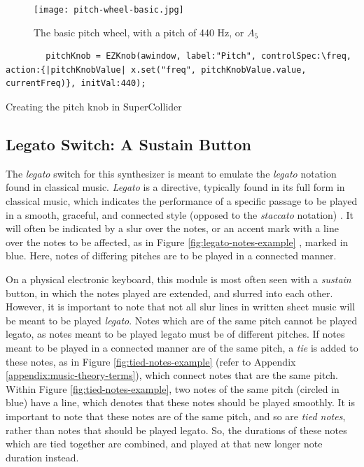 \begin{figure}
  \centering
  \texttt{[image: pitch-wheel-basic.jpg]}
  \caption{The basic pitch wheel, with a pitch of 440 Hz, or $A_5$}
  \label{fig:pitch-wheel-basic}
\end{figure}

\begin{listing}
	\begin{lstlisting}
		pitchKnob = EZKnob(awindow, label:"Pitch", controlSpec:\freq, action:{|pitchKnobValue| x.set("freq", pitchKnobValue.value, currentFreq)}, initVal:440);
	\end{lstlisting}
	\caption{Creating the pitch knob in SuperCollider}
	\label{lst:pitch-knob-waveform}
\end{listing}



\subsection{Legato Switch: A Sustain Button}

The \textit{legato} switch for this synthesizer is meant to emulate the \textit{legato} notation found in classical music. \textit{Legato} is a directive, typically found in its full form in classical music, which indicates the performance of a specific passage to be played in a smooth, graceful, and connected style (opposed to the \textit{staccato} notation) \cite{Winer_2018}. It will often be indicated by a slur over the notes, or an accent mark with a line over the notes to be affected, as in Figure \ref{fig:legato-notes-example} \cite{Henle_2009}, marked in blue. Here, notes of differing pitches are to be played in a connected manner. 

On a physical electronic keyboard, this module is most often seen with a \textit{sustain} button, in which the notes played are extended, and slurred into each other. However, it is important to note that not all slur lines in written sheet music will be meant to be played \textit{legato}. Notes which are of the same pitch cannot be played legato, as notes meant to be played legato must be of different pitches. If notes meant to be played in a connected manner are of the same pitch, a \textit{tie} is added to these notes, as in Figure \ref{fig:tied-notes-example} \cite{Lung_2016} (refer to Appendix \ref{appendix:music-theory-terms}), which connect notes that are the same pitch. Within Figure \ref{fig:tied-notes-example}, two notes of the same pitch (circled in blue) have a line, which denotes that these notes should be played smoothly. It is important to note that these notes are of the same pitch, and so are \textit{tied notes}, rather than notes that should be played legato. So, the durations of these notes which are tied together are combined, and played at that new longer note duration instead. 

